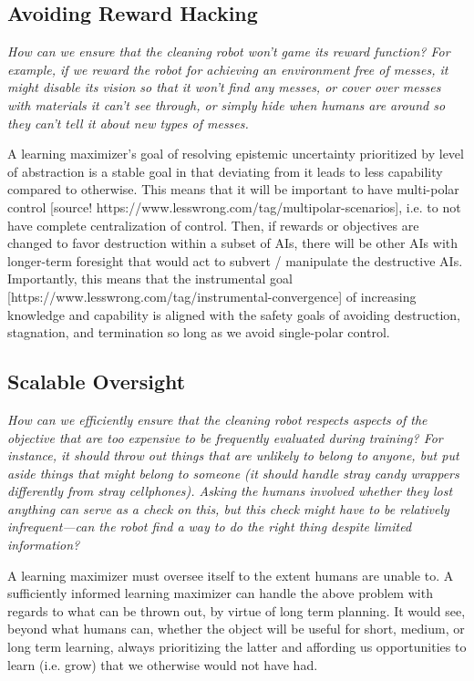 \documentclass{article}
\begin{document}
\subsection{Avoiding Reward Hacking}

\textit{How can we ensure that the cleaning robot won’t game its
reward function? For example, if we reward the robot for achieving an environment free of messes, it might disable its vision so that it won’t find any messes, or cover over messes with materials it can’t see through, or simply hide when humans are around so they can’t tell it about new types of messes.}

\hspace{}

A learning maximizer's goal of resolving epistemic uncertainty prioritized by level of abstraction is a stable goal in that deviating from it leads to less capability compared to otherwise. This means that it will be important to have multi-polar control [source! https://www.lesswrong.com/tag/multipolar-scenarios], i.e. to not have complete centralization of control. Then, if rewards or objectives are changed to favor destruction within a subset of AIs, there will be other AIs with longer-term foresight that would act to subvert / manipulate the destructive AIs. Importantly, this means that the instrumental goal [https://www.lesswrong.com/tag/instrumental-convergence] of increasing knowledge and capability is aligned with the safety goals of avoiding destruction, stagnation, and termination so long as we avoid single-polar control.

\subsection{Scalable Oversight}
\textit{How can we efficiently ensure that the cleaning robot respects aspects of
the objective that are too expensive to be frequently evaluated during training? For instance, it
should throw out things that are unlikely to belong to anyone, but put aside things that might
belong to someone (it should handle stray candy wrappers differently from stray cellphones).
Asking the humans involved whether they lost anything can serve as a check on this, but this
check might have to be relatively infrequent—can the robot find a way to do the right thing
despite limited information?}

\hspace{}

A learning maximizer must oversee itself to the extent humans are unable to. A sufficiently informed learning
maximizer can handle the above problem with regards to what can be thrown out, by
virtue of long term planning. It would see, beyond what humans can, whether the object will
be useful for short, medium, or long term learning, always prioritizing the latter and affording us opportunities to learn (i.e. grow) that we otherwise would not have had.
\end{document}
